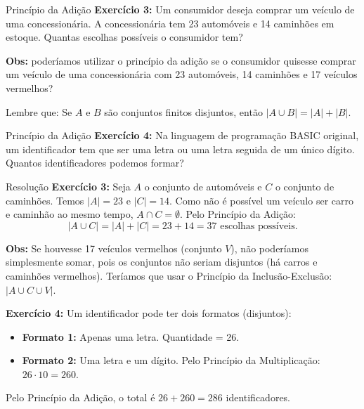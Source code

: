 \documentclass[9pt]{beamer}
\begin{document}
\begin{frame}{Princípio da Adição}
\textbf{Exercício 3:} Um consumidor deseja comprar um veículo de uma concessionária. A concessionária tem 23 automóveis e 14 caminhões em estoque. Quantas escolhas possíveis o consumidor tem?

\vspace{0.5cm}

\textbf{Obs:} poderíamos utilizar o princípio da adição se o consumidor quisesse comprar um veículo de uma concessionária com 23 automóveis, 14 caminhões e 17 veículos vermelhos?

\vspace{0.5cm}
Lembre que: Se $A$ e $B$ são conjuntos finitos disjuntos, então $|A \cup B| = |A| + |B|$.
\end{frame}

\begin{frame}{Princípio da Adição}
\textbf{Exercício 4:} Na linguagem de programação BASIC original, um identificador tem que ser uma letra ou uma letra seguida de um único dígito. Quantos identificadores podemos formar?
\end{frame}

\begin{frame}{Resolução}
\textbf{Exercício 3:}
Seja $A$ o conjunto de automóveis e $C$ o conjunto de caminhões.
Temos $|A| = 23$ e $|C| = 14$. Como não é possível um veículo ser carro e caminhão ao mesmo tempo, $A \cap C = \emptyset$.
Pelo Princípio da Adição:
\[ |A \cup C| = |A| + |C| = 23 + 14 = 37 \text{ escolhas possíveis.} \]

\textbf{Obs:} Se houvesse 17 veículos vermelhos (conjunto $V$), não poderíamos simplesmente somar, pois os conjuntos não seriam disjuntos (há carros e caminhões vermelhos). Teríamos que usar o Princípio da Inclusão-Exclusão: $|A \cup C \cup V|$.

\vspace{0.4cm}

\textbf{Exercício 4:}
Um identificador pode ter dois formatos (disjuntos):
\begin{itemize}
    \item \textbf{Formato 1:} Apenas uma letra. Quantidade = 26.
    \item \textbf{Formato 2:} Uma letra e um dígito. Pelo Princípio da Multiplicação: $26 \cdot 10 = 260$.
\end{itemize}
Pelo Princípio da Adição, o total é $26 + 260 = 286$ identificadores.
\end{frame}
\end{document}
